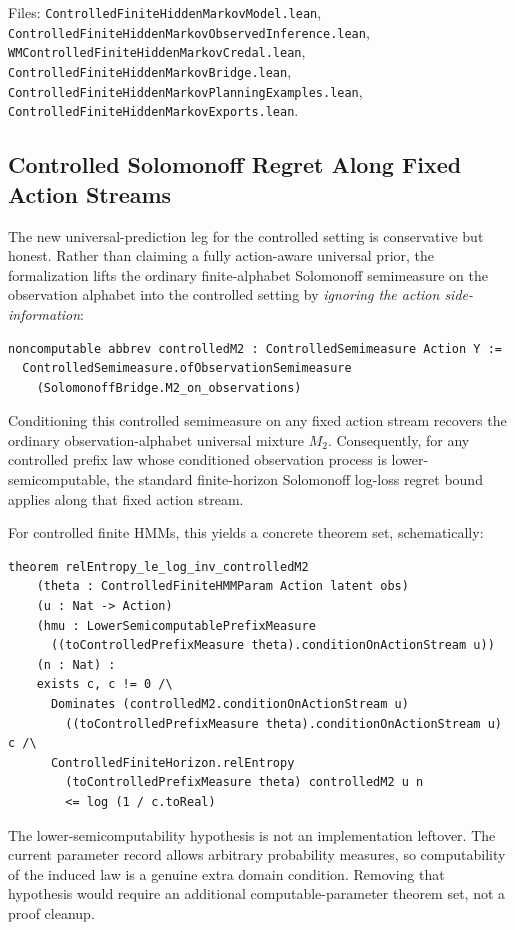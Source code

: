 \documentclass[11pt,a4paper]{article}
\theoremstyle{definition}
\begin{document}
Files:
\texttt{ControlledFiniteHiddenMarkovModel.lean},
\texttt{ControlledFiniteHiddenMarkovObservedInference.lean},
\texttt{WMControlledFiniteHiddenMarkovCredal.lean},
\texttt{ControlledFiniteHiddenMarkovBridge.lean},
\texttt{ControlledFiniteHiddenMarkovPlanningExamples.lean},
\texttt{ControlledFiniteHiddenMarkovExports.lean}.

\subsection{Controlled Solomonoff Regret Along Fixed Action Streams}

The new universal-prediction leg for the controlled setting is conservative but
honest.  Rather than claiming a fully action-aware universal prior, the
formalization lifts the ordinary finite-alphabet Solomonoff semimeasure on the
observation alphabet into the controlled setting by \emph{ignoring the action
side-information}:

\begin{lstlisting}
noncomputable abbrev controlledM2 : ControlledSemimeasure Action Y :=
  ControlledSemimeasure.ofObservationSemimeasure
    (SolomonoffBridge.M2_on_observations)
\end{lstlisting}

Conditioning this controlled semimeasure on any fixed action stream recovers
the ordinary observation-alphabet universal mixture $M_2$.  Consequently, for any
controlled prefix law whose conditioned observation process is
lower-semicomputable, the standard finite-horizon Solomonoff log-loss regret
bound applies along that fixed action stream.

For controlled finite HMMs, this yields a concrete theorem set, schematically:
\begin{lstlisting}
theorem relEntropy_le_log_inv_controlledM2
    (theta : ControlledFiniteHMMParam Action latent obs)
    (u : Nat -> Action)
    (hmu : LowerSemicomputablePrefixMeasure
      ((toControlledPrefixMeasure theta).conditionOnActionStream u))
    (n : Nat) :
    exists c, c != 0 /\
      Dominates (controlledM2.conditionOnActionStream u)
        ((toControlledPrefixMeasure theta).conditionOnActionStream u) c /\
      ControlledFiniteHorizon.relEntropy
        (toControlledPrefixMeasure theta) controlledM2 u n
        <= log (1 / c.toReal)
\end{lstlisting}

The lower-semicomputability hypothesis is not an implementation leftover.  The
current parameter record allows arbitrary probability measures, so computability
of the induced law is a genuine extra domain condition.  Removing that
hypothesis would require an additional computable-parameter theorem set, not a
proof cleanup.
\end{document}
